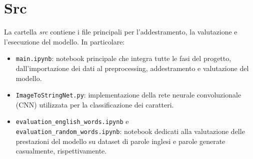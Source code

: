 \section{Src}
La cartella \emph{src} contiene i file principali per l'addestramento, la valutazione e l'esecuzione del modello. In particolare:
\begin{itemize}
    \item \texttt{main.ipynb}: notebook principale che integra tutte le fasi del progetto, dall'importazione dei dati al preprocessing, addestramento e valutazione del modello.
    \item \texttt{ImageToStringNet.py}: implementazione della rete neurale convoluzionale (CNN) utilizzata per la classificazione dei caratteri.
    \item \texttt{evaluation\_english\_words.ipynb} e \\ \texttt{evaluation\_random\_words.ipynb}: notebook dedicati alla valutazione delle prestazioni del modello su dataset di parole inglesi e parole generate casualmente, rispettivamente.
\end{itemize}